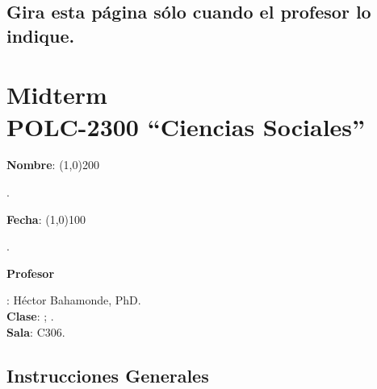 \documentclass{article}
\begin{document}
\subsection*{Gira esta p\'agina s\'olo cuando el profesor lo indique.}

\clearpage
\newpage

{\centering\section*{Midterm\\POLC-2300 ``Ciencias Sociales''}}

{\vspace{.5cm}\raggedright{\bf Nombre}: \line(1,0){200}}. %
{\vspace{.5cm}\hspace{4.5cm}\raggedright{\bf Fecha}: \line(1,0){100}}. %


{\vspace{.5cm}\raggedright \bf Profesor}: H\'ector Bahamonde, PhD.\\
{\bf Clase}: {\unskip}; {\unskip}.\\
{\bf Sala}: C306.


\vspace{0.5cm}\subsection*{Instrucciones Generales}
\end{document}
